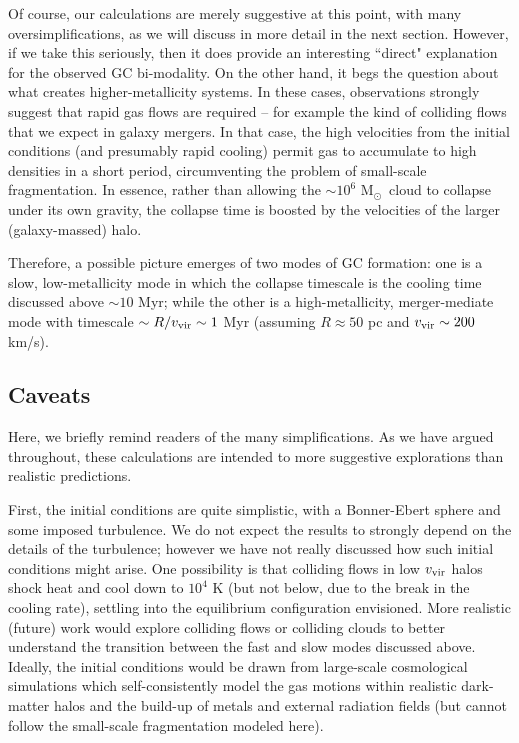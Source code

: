 \documentclass[useAMS,usenatbib]{mn2e}
\newcommand{\msun}{{M$_\odot$}}
\begin{document}
Of course, our calculations are merely suggestive at this point, with many oversimplifications, as we will discuss in more detail in the next section.  However, if we take this seriously, then it does provide an interesting ``direct" explanation for the observed GC bi-modality.  On the other hand, it begs the question about what creates higher-metallicity systems.  In these cases, observations strongly suggest that rapid gas flows are required -- for example the kind of colliding flows that we expect in galaxy mergers.  In that case, the high velocities from the initial conditions (and presumably rapid cooling) permit gas to accumulate to high densities in a short period, circumventing the problem of small-scale fragmentation.  In essence, rather than allowing the $\sim 10^6$ \msun\ cloud to collapse under its own gravity, the collapse time is boosted by the velocities of the larger (galaxy-massed) halo.  

Therefore, a possible picture emerges of two modes of GC formation: one is a slow, low-metallicity mode in which the collapse timescale is the cooling time discussed above $\sim 10$ Myr; while the other is a high-metallicity, merger-mediate mode with timescale $\sim R/v_{\rm vir} \sim 1$ Myr (assuming $R \approx 50$ pc and $v_{\rm vir} \sim 200$ km/s).

\subsection{Caveats}

Here, we briefly remind readers of the many simplifications.  As we have argued throughout, these calculations are intended to more suggestive explorations than realistic predictions.  

First, the initial conditions are quite simplistic, with a Bonner-Ebert sphere and some imposed turbulence.  We do not expect the results to strongly depend on the details of the turbulence; however we have not really discussed how such initial conditions might arise.  One possibility is that colliding flows in low $v_{\rm vir}$ halos shock heat and cool down to $10^4$ K (but not below, due to the break in the cooling rate), settling into the equilibrium configuration envisioned.  More realistic (future) work would explore colliding flows or colliding clouds to better understand the transition between the fast and slow modes discussed above.  Ideally, the initial conditions would be drawn from large-scale cosmological simulations which self-consistently model the gas motions within realistic dark-matter halos and the build-up of metals and external radiation fields (but cannot follow the small-scale fragmentation modeled here).
\end{document}
